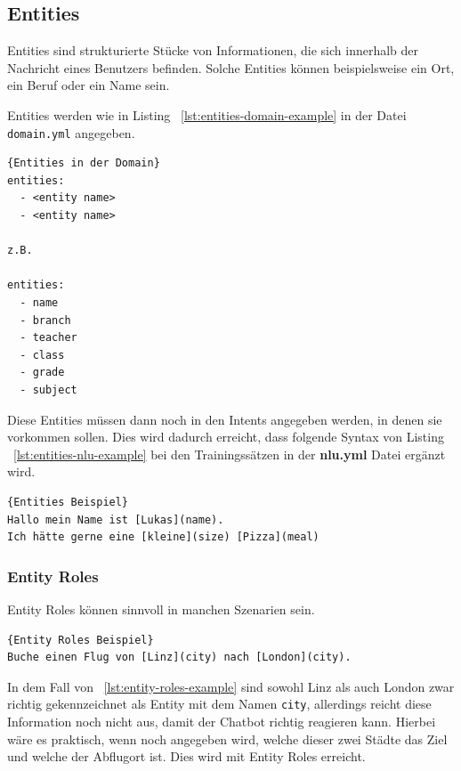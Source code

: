 \subsection{Entities}\label{subsection:entities}

Entities sind strukturierte Stücke von Informationen, die sich innerhalb der Nachricht eines Benutzers befinden.
Solche Entities können beispielsweise ein Ort, ein Beruf oder ein Name sein.\cite{entities}

Entities werden wie in Listing ~\ref{lst:entities-domain-example} in der Datei \texttt{domain.yml} angegeben.

\begin{lstlisting}[label={lst:entities-domain-example},caption={Entities in der Domain}]{Entities in der Domain}
entities:
  - <entity name>
  - <entity name>

z.B.

entities:
  - name
  - branch
  - teacher
  - class
  - grade
  - subject
\end{lstlisting}

Diese Entities müssen dann noch in den Intents angegeben werden, in denen sie vorkommen sollen.
Dies wird dadurch erreicht, dass folgende Syntax von Listing ~\ref{lst:entities-nlu-example} bei den Trainingssätzen in der \textbf{nlu.yml} Datei ergänzt wird.

\begin{lstlisting}[label={lst:entities-nlu-example},caption={Entities Beispiel}]{Entities Beispiel}
Hallo mein Name ist [Lukas](name).
Ich hätte gerne eine [kleine](size) [Pizza](meal)
\end{lstlisting}

\subsubsection{Entity Roles}\label{subsubsec:entity-roles}

Entity Roles können sinnvoll in manchen Szenarien sein.

\begin{lstlisting}[label={lst:entity-roles-example},caption={Entity Roles Beispiel}]{Entity Roles Beispiel}
Buche einen Flug von [Linz](city) nach [London](city).
\end{lstlisting}

In dem Fall von ~\ref{lst:entity-roles-example} sind sowohl Linz als auch London zwar richtig gekennzeichnet als Entity mit dem Namen \texttt{city}, allerdings reicht diese Information noch nicht aus, damit der Chatbot richtig reagieren kann.
Hierbei wäre es praktisch, wenn noch angegeben wird, welche dieser zwei Städte das Ziel und welche der Abflugort ist.
Dies wird mit Entity Roles erreicht.\cite{entityRolesGroups}

